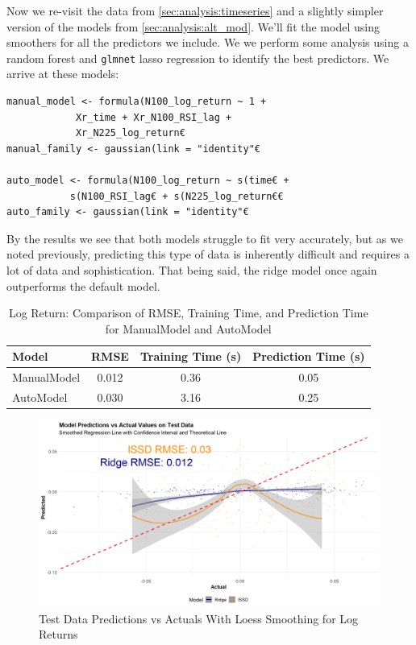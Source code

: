 \documentclass[12pt, twoside,hidelinks]{article}
\theoremstyle{definition}
\numberwithin{equation}{section}
\begin{document}
Now we re-visit the data from \ref{sec:analysis:timeseries} and a slightly simpler version of the models from \ref{sec:analysis:alt_mod}. We'll fit the model using smoothers for all the predictors we include. We we perform some analysis using a random forest and \texttt{glmnet} lasso regression to identify the best predictors. We arrive at these models: 

\begin{lstlisting}
manual_model <- formula(N100_log_return ~ 1 + 
            Xr_time + Xr_N100_RSI_lag + 
            Xr_N225_log_return€
manual_family <- gaussian(link = "identity"€

auto_model <- formula(N100_log_return ~ s(time€ + 
           s(N100_RSI_lag€ + s(N225_log_return€€
auto_family <- gaussian(link = "identity"€
\end{lstlisting}

By the results we see that both models struggle to fit very accurately, but as we noted previously, predicting this type of data is inherently difficult and requires a lot of data and sophistication. That being said, the ridge model once again outperforms the default model. 

\newpage

\begin{table}[H]
\centering
\begin{tabular}{lccc}
\toprule
\textbf{Model} & \textbf{RMSE} & \textbf{Training Time (s)} & \textbf{Prediction Time (s)} \\
\midrule
ManualModel & 0.012 & 0.36 & 0.05 \\
AutoModel   & 0.030 & 3.16 & 0.25 \\
\bottomrule
\end{tabular}
\caption{Log Return: Comparison of RMSE, Training Time, and Prediction Time for ManualModel and AutoModel}
\label{tab:model_comparison}
\end{table}

\begin{figure}[H]
\includegraphics[width=\textwidth]{visuals/ridge/loess_issd_ridge_new.png}
\caption{Test Data Predictions vs Actuals With Loess Smoothing for Log Returns}
\label{loess_logreturn_ridge}
\end{figure}
\end{document}

